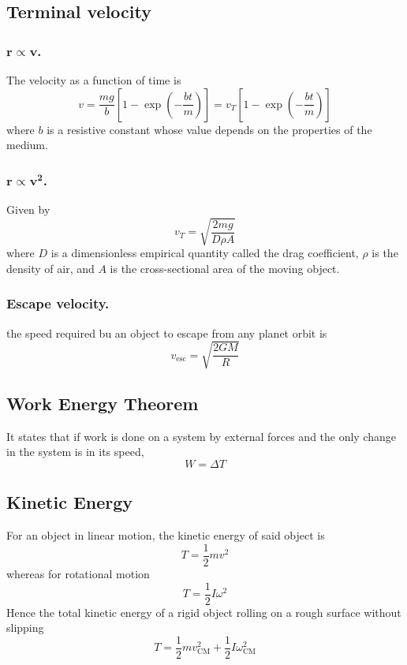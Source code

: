 \documentclass[../../../main.tex]{subfiles}
\begin{document}
\subsection*{Terminal velocity}
\subsubsection*{$\boldsymbol{r\propto v}$.} The velocity as a function of time is 
\begin{equation*}
    v=\frac{mg}{b}\left[1-\exp\left(-\frac{bt}{m}\right)\right]=v_T\left[1-\exp\left(-\frac{bt}{m}\right)\right]
\end{equation*}
where $b$ is a resistive constant whose value depends on the properties of the medium.
\subsubsection*{$\boldsymbol{r\propto v^2}$.} Given by 
\begin{equation*}
    v_T=\sqrt{\frac{2mg}{D\rho A}}
\end{equation*}
where $D$ is a dimensionless empirical quantity called the drag coefficient, $\rho$ is the density of air, and $A$ is the cross-sectional area of the moving object.

\subsubsection*{Escape velocity.} the speed required bu an object to escape from any planet orbit is 
\begin{equation*}
    v_\text{esc}=\sqrt{\frac{2GM}{R}}
\end{equation*}

\subsection*{Work Energy Theorem}
It states that if work is done on a system by external forces and
the only change in the system is in its speed,
\begin{equation*}
    W=\Delta T
\end{equation*}
\subsection*{Kinetic Energy}
For an object in linear motion, the kinetic energy of said object is 
\begin{equation*}
    T=\frac{1}{2}mv^2
\end{equation*}
whereas for rotational motion
\begin{equation*}
    T=\frac{1}{2}I\omega^2
\end{equation*}
Hence the total kinetic energy of a rigid object rolling on a rough surface without slipping
\begin{equation*}
    T=\frac{1}{2}mv_\text{CM}^2+\frac{1}{2}I\omega_\text{CM}^2
\end{equation*}
\end{document}
